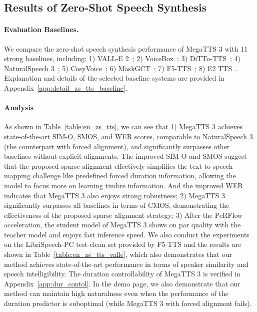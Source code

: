 \subsection{Results of Zero-Shot Speech Synthesis}
\label{exp_zero-shot}


\paragraph{Evaluation Baselines.} We compare the zero-shot speech synthesis performance of MegaTTS 3 with 11 strong baselines, including: 1) VALL-E 2~\citep{chen2024vall}; 2) VoiceBox~\citep{le2023Voicebox}; 3) DiTTo-TTS~\citep{lee2024ditto}; 4) NaturalSpeech 3~\citep{ju2024naturalspeech}; 5) CosyVoice~\citep{du2024cosyvoice}; 6) MaskGCT~\citep{wang2024maskgct}; 7) F5-TTS~\citep{chen2024f5}; 8) E2 TTS~\citep{eskimez2024e2}. Explanation and details of the selected baseline systems are provided in Appendix~\ref{app:detail_zs_tts_baseline}.



\paragraph{Analysis} 
As shown in Table~\ref{table:en_zs_tts}, we can see that 1) MegaTTS 3 achieves state-of-the-art SIM-O, SMOS, and WER scores, comparable to NaturalSpeech 3 (the counterpart with forced alignment), and significantly surpasses other baselines without explicit alignments. The improved SIM-O and SMOS suggest that the proposed sparse alignment effectively simplifies the text-to-speech mapping challenge like predefined forced duration information, allowing the model to focus more on learning timbre information. And the improved WER indicates that MegaTTS 3 also enjoys strong robustness; 2) MegaTTS 3 significantly surpasses all baselines in terms of CMOS, demonstrating the effectiveness of the proposed sparse alignment strategy; 3) After the PeRFlow acceleration, the student model of MegaTTS 3 shows on par quality with the teacher model and enjoys fast inference speed. We also conduct the experiments on the LibriSpeech-PC test-clean set provided by F5-TTS and the results are shown in Table~\ref{table:en_zs_tts_valle}, which also demonstrates that our method achieves state-of-the-art performance in terms of speaker similarity and speech intelligibility. The duration controllability of MegaTTS 3 is verified in Appendix~\ref{app:dur_contol}. In the demo page, we also demonstrate that our method can maintain high naturalness even when the performance of the duration predictor is suboptimal (while MegaTTS 3 with forced alignment fails).



